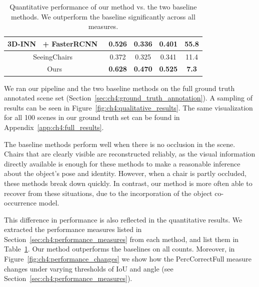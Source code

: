 \documentclass[10pt,twocolumn,letterpaper]{article}
\begin{document}
\begin{table}[h!]
{\begin{tabular}{|c|c|c|c|c|}
        3D-INN~\cite{Wu:2016:ECCV} + FasterRCNN~\cite{Ren:2015:NIPS}  & 0.526                   & 0.336                & 0.401            & 55.8                   \\ \hline
        SeeingChairs~\cite{Aubry:2014:CVPR}                           & 0.372                   & 0.325                & 0.341            & 11.4                   \\ \hline
        Ours                                                          & \textbf{0.628}          & \textbf{0.470}       & \textbf{0.525}   & \textbf{7.3}           \\ \hline

        \end{tabular}
    }
    \caption[Quantitative performance]{Quantitative performance of our method vs. the two baseline methods. We outperform the baseline significantly across all measures.}
    \label{tab:ch4:performance}
\end{table}
We ran our pipeline and the two baseline methods on the full ground truth
annotated scene set (Section~\ref{sec:ch4:ground_truth_annotation}). A sampling
of results can be seen in Figure~\ref{fig:ch4:qualitative_results}. The same visualization
for all 100 scenes in our ground truth set can be found in Appendix~\ref{app:ch4:full_results}.

The baseline methods perform well when there is no occlusion in the scene.
Chairs that are clearly visible are reconstructed reliably, as the visual
information directly available is enough for these methods to make a reasonable
inference about the object's pose and identity. However, when a chair is partly
occluded, these methods break down quickly. In contrast, our method is more
often able to recover from these situations, due to the incorporation of the
object co-occurrence model. 

This difference in performance is also reflected in the quantitative results. We
extracted the performance measures listed in
Section~\ref{sec:ch4:performance_measures} from each method, and list them in
Table~\ref{tab:ch4:performance}. Our method outperforms the baselines on all
counts.  Moreover, in Figure~\ref{fig:ch4:performance_changes} we show how the
PercCorrectFull measure changes under varying thresholds of IoU and angle (see
Section~\ref{sec:ch4:performance_measures}).
\end{document}
